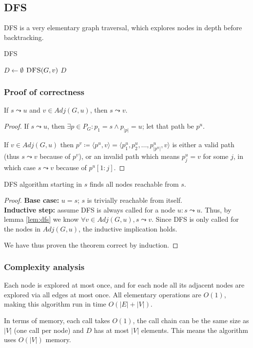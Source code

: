 \subsection{\texorpdfstring{\Acrlong*{DFS}}{Depth-first search}} \label{algorithm-reachability-dfs}
\Acrlong*{DFS} is a very elementary graph traversal, which explores nodes in depth before backtracking.
\begin{algorithm}[h]
    \caption{\Acrlong*{DFS}}
    \label{alg-dfs}
    \begin{algorithmic}[1]
        \State $D \gets \emptyset$
             \Return {$ $}
            \EndIf 
             {$\Call{DFS}{G, v}$}
            \EndFor
            \State \Return $D$
        \EndFunction
    \end{algorithmic}
\end{algorithm}
\subsubsection{Proof of correctness}
\begin{lemma} \label{lem:dfs}
    If $s \leadsto u$ and $v \in Adj(G, u)$, then $s \leadsto v$.
\end{lemma}
\begin{proof}
    If $s \leadsto u$, then $\exists p \in P_G \colon p_1 = s \wedge p_{|p|} = u$; let that path be $p^u$.\par
    If $v \in Adj(G, u)$ then $p^v \coloneqq \langle p^u, v \rangle = \langle p^u_1, p^u_2,...,p^u_{|p^u|}, v\rangle$ is either a valid path (thus $s \leadsto v$ because of $p^v$), or an invalid path which means $p^u_j = v$ for some $j$, in which case $s \leadsto v$ because of $p^u[1:j]$.
\end{proof}
\vspace{2em}
\begin{theorem} \label{teor:dfs}
    \Acrlong*{DFS} algorithm starting in $s$ finds all nodes reachable from $s$.
\end{theorem}
\begin{proof} \textbf{Base case:} $u=s$; $s$ is trivially reachable from itself. \\
\textbf{Inductive step:} assume \textsc{DFS} is always called for a node $u \colon s \leadsto u$. Thus, by lemma \ref{lem:dfs} we know $\forall v \in Adj(G,u), s \leadsto v$. Since \textsc{DFS} is only called for the nodes in $Adj(G,u)$, the inductive implication holds.\par
We have thus proven the theorem correct by induction.
\end{proof}
\subsubsection{Complexity analysis}
Each node is explored at most once, and for each node all its adjacent nodes are explored via all edges at most once. All elementary operations are $O(1)$, making this algorithm run in time $O(|E|+|V|)$.\par
In terms of memory, each call takes $O(1)$, the call chain can be the same size as $|V|$ (one call per node) and $D$ has at most $|V|$ elements. This means the algorithm uses $O(|V|)$ memory.
